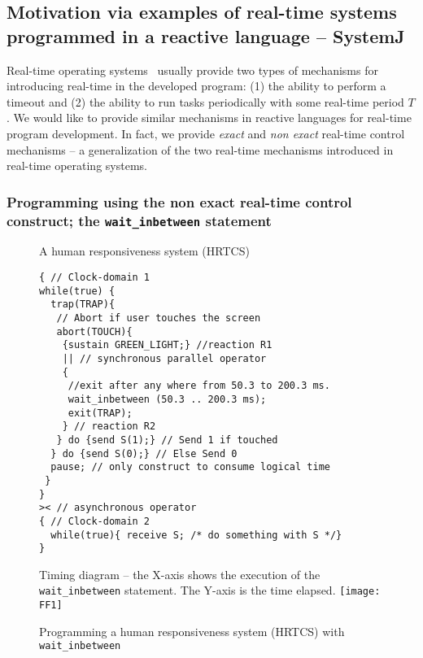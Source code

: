 \subsection{Motivation via examples of real-time systems programmed in a
reactive language -- SystemJ}
\label{sec:motivating-example}


Real-time operating systems~\cite{barry2009using} usually provide two
types of mechanisms for introducing real-time in the developed program:
(1) the ability to perform a timeout and (2) the ability to run tasks
periodically with some real-time period $T$. We would like to provide
similar mechanisms in reactive languages for real-time program
development. In fact, we provide \textit{exact} and \textit{non exact}
real-time control mechanisms -- a generalization of the two real-time
mechanisms introduced in real-time operating systems.

\subsubsection{Programming using the non exact real-time control
  construct; the \textrm{\texttt{wait\_inbetween}} statement}
\label{sec:progr-using-non}

\begin{figure}[t!]
	\vspace{-10pt}
        \begin{SubFloat}{\label{delaycode:a}A human responsiveness
            system (HRTCS)}
        \begin{lstlisting}[style=sysj,morekeywords={sustain,send,receive,abort,await,emit,present,trap,pause,exit,wait_inbetween,suspend}]
{ // Clock-domain 1
while(true) {
  trap(TRAP){
   // Abort if user touches the screen
   abort(TOUCH){
    {sustain GREEN_LIGHT;} //reaction R1
    || // synchronous parallel operator
    {
     //exit after any where from 50.3 to 200.3 ms.
     wait_inbetween (50.3 .. 200.3 ms); 
     exit(TRAP); 
    } // reaction R2
   } do {send S(1);} // Send 1 if touched 
  } do {send S(0);} // Else Send 0
  pause; // only construct to consume logical time
 }
}
>< // asynchronous operator
{ // Clock-domain 2
  while(true){ receive S; /* do something with S */}
}
\end{lstlisting}
\end{SubFloat}
\begin{SubFloat}{\label{delaycode:b}Timing diagram -- the X-axis shows
    the execution of the \texttt{wait\_inbetween} statement. The Y-axis
    is the time elapsed.}
    \centering
    \texttt{[image: FF1]}
\end{SubFloat}
\caption{Programming a human responsiveness system (HRTCS) with
  \texttt{wait\_inbetween}}
\label{fig:1}
\end{figure}

